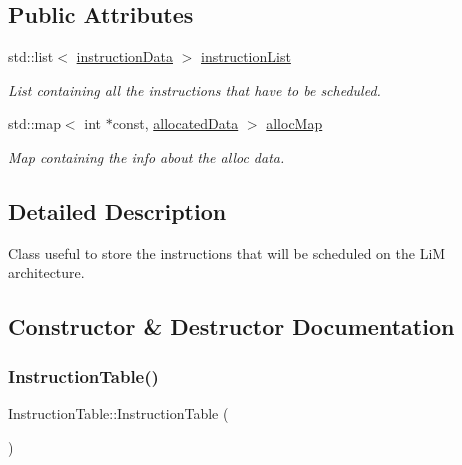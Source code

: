 \subsection*{Public Attributes}
\begin{DoxyCompactItemize}
\item 
std\+::list$<$ \hyperlink{structoctantis_1_1InstructionTable_1_1instructionData}{instruction\+Data} $>$ \hyperlink{classoctantis_1_1InstructionTable_a3b03228ed9a4db4430563ff61fcc6c6e}{instruction\+List}
\begin{DoxyCompactList}\small\item\em List containing all the instructions that have to be scheduled. \end{DoxyCompactList}\item 
std\+::map$<$ int $\ast$const, \hyperlink{structoctantis_1_1InstructionTable_1_1allocatedData}{allocated\+Data} $>$ \hyperlink{classoctantis_1_1InstructionTable_a3a31a38f9f92b0ecd72c63698fe02808}{alloc\+Map}
\begin{DoxyCompactList}\small\item\em Map containing the info about the alloc data. \end{DoxyCompactList}\end{DoxyCompactItemize}


\subsection{Detailed Description}
Class useful to store the instructions that will be scheduled on the LiM architecture. 

\subsection{Constructor \& Destructor Documentation}
\mbox{\label{classoctantis_1_1InstructionTable_a59d38f5661dff5c938a8ee4e85213f27}} 
\subsubsection{\texorpdfstring{Instruction\+Table()}{InstructionTable()}}
{\footnotesize\ttfamily Instruction\+Table\+::\+Instruction\+Table (\begin{DoxyParamCaption}{ }\end{DoxyParamCaption})}



